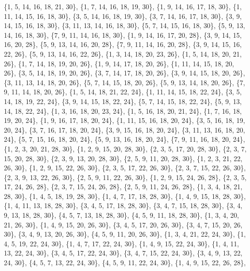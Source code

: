 \documentclass[11pt,a4paper]{article}
\begin{document}
{\{1, 5, 14, 16, 18, 21, 30\}, \{1, 7, 14, 16, 18, 19, 30\}, \{1, 9, 14, 16, 17, 18, 30\}, \{1, 11, 14, 15, 16, 18, 30\}, \{3, 5, 14, 16, 18, 19, 30\},
\{3, 7, 14, 16, 17, 18, 30\}, \{3, 9, 14, 15, 16, 18, 30\}, \{3, 11, 13, 14, 16, 18, 30\}, \{5, 7, 14, 15, 16, 18, 30\}, \{5, 9, 13, 14, 16, 18, 30\},
\{7, 9, 11, 14, 16, 18, 30\}, \{1, 9, 14, 16, 17, 20, 28\}, \{3, 9, 14, 15, 16, 20, 28\}, \{5, 9, 13, 14, 16, 20, 28\}, \{7, 9, 11, 14, 16, 20, 28\},
\{3, 9, 14, 15, 16, 22, 26\}, \{5, 9, 13, 14, 16, 22, 26\}, \{1, 3, 14, 18, 20, 23, 26\}, \{1, 5, 14, 18, 20, 21, 26\}, \{1, 7, 14, 18, 19, 20, 26\},
\{1, 9, 14, 17, 18, 20, 26\}, \{1, 11, 14, 15, 18, 20, 26\}, \{3, 5, 14, 18, 19, 20, 26\}, \{3, 7, 14, 17, 18, 20, 26\}, \{3, 9, 14, 15, 18, 20, 26\},
\{3, 11, 13, 14, 18, 20, 26\}, \{5, 7, 14, 15, 18, 20, 26\}, \{5, 9, 13, 14, 18, 20, 26\}, \{7, 9, 11, 14, 18, 20, 26\}, \{1, 5, 14, 18, 21, 22, 24\},
\{1, 11, 14, 15, 18, 22, 24\}, \{3, 5, 14, 18, 19, 22, 24\}, \{3, 9, 14, 15, 18, 22, 24\}, \{5, 7, 14, 15, 18, 22, 24\}, \{5, 9, 13, 14, 18, 22, 24\},
\{1, 3, 16, 18, 20, 23, 24\}, \{1, 5, 16, 18, 20, 21, 24\}, \{1, 7, 16, 18, 19, 20, 24\}, \{1, 9, 16, 17, 18, 20, 24\}, \{1, 11, 15, 16, 18, 20, 24\},
\{3, 5, 16, 18, 19, 20, 24\}, \{3, 7, 16, 17, 18, 20, 24\}, \{3, 9, 15, 16, 18, 20, 24\}, \{3, 11, 13, 16, 18, 20, 24\}, \{5, 7, 15, 16, 18, 20, 24\},
\{5, 9, 13, 16, 18, 20, 24\}, \{7, 9, 11, 16, 18, 20, 24\}, \{1, 2, 3, 20, 21, 28, 30\}, \{1, 2, 9, 15, 20, 28, 30\}, \{2, 3, 5, 17, 20, 28, 30\},
\{2, 3, 7, 15, 20, 28, 30\}, \{2, 3, 9, 13, 20, 28, 30\}, \{2, 5, 9, 11, 20, 28, 30\}, \{1, 2, 3, 21, 22, 26, 30\}, \{1, 2, 9, 15, 22, 26, 30\},
\{2, 3, 5, 17, 22, 26, 30\}, \{2, 3, 7, 15, 22, 26, 30\}, \{2, 3, 9, 13, 22, 26, 30\}, \{2, 5, 9, 11, 22, 26, 30\}, \{1, 2, 9, 15, 24, 26, 28\},
\{2, 3, 5, 17, 24, 26, 28\}, \{2, 3, 7, 15, 24, 26, 28\}, \{2, 5, 9, 11, 24, 26, 28\}, \{1, 3, 4, 18, 21, 28, 30\}, \{1, 4, 5, 18, 19, 28, 30\},
\{1, 4, 7, 17, 18, 28, 30\}, \{1, 4, 9, 15, 18, 28, 30\}, \{1, 4, 11, 13, 18, 28, 30\}, \{3, 4, 5, 17, 18, 28, 30\}, \{3, 4, 7, 15, 18, 28, 30\},
\{3, 4, 9, 13, 18, 28, 30\}, \{4, 5, 7, 13, 18, 28, 30\}, \{4, 5, 9, 11, 18, 28, 30\}, \{1, 3, 4, 20, 21, 26, 30\}, \{1, 4, 9, 15, 20, 26, 30\},
\{3, 4, 5, 17, 20, 26, 30\}, \{3, 4, 7, 15, 20, 26, 30\}, \{3, 4, 9, 13, 20, 26, 30\}, \{4, 5, 9, 11, 20, 26, 30\}, \{1, 3, 4, 21, 22, 24, 30\},
\{1, 4, 5, 19, 22, 24, 30\}, \{1, 4, 7, 17, 22, 24, 30\}, \{1, 4, 9, 15, 22, 24, 30\}, \{1, 4, 11, 13, 22, 24, 30\}, \{3, 4, 5, 17, 22, 24, 30\},
\{3, 4, 7, 15, 22, 24, 30\}, \{3, 4, 9, 13, 22, 24, 30\}, \{4, 5, 7, 13, 22, 24, 30\}, \{4, 5, 9, 11, 22, 24, 30\}, \{1, 4, 9, 15, 22, 26, 28\},
}
\end{document}
